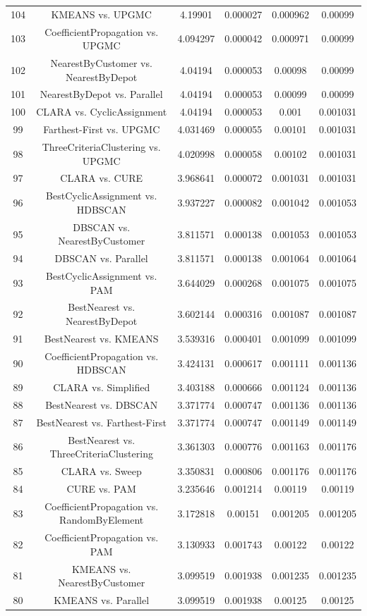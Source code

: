 \documentclass[a4paper,10pt]{article}
\begin{document}
\begin{landscape}
\begin{table}[!htp]
\begin{tabular}{cccccc}
104&KMEANS vs. UPGMC&4.19901&0.000027&0.000962&0.00099\\
103&CoefficientPropagation vs. UPGMC&4.094297&0.000042&0.000971&0.00099\\
102&NearestByCustomer vs. NearestByDepot&4.04194&0.000053&0.00098&0.00099\\
101&NearestByDepot vs. Parallel&4.04194&0.000053&0.00099&0.00099\\
100&CLARA vs. CyclicAssignment&4.04194&0.000053&0.001&0.001031\\
99&Farthest-First vs. UPGMC&4.031469&0.000055&0.00101&0.001031\\
98&ThreeCriteriaClustering vs. UPGMC&4.020998&0.000058&0.00102&0.001031\\
97&CLARA vs. CURE&3.968641&0.000072&0.001031&0.001031\\
96&BestCyclicAssignment vs. HDBSCAN&3.937227&0.000082&0.001042&0.001053\\
95&DBSCAN vs. NearestByCustomer&3.811571&0.000138&0.001053&0.001053\\
94&DBSCAN vs. Parallel&3.811571&0.000138&0.001064&0.001064\\
93&BestCyclicAssignment vs. PAM&3.644029&0.000268&0.001075&0.001075\\
92&BestNearest vs. NearestByDepot&3.602144&0.000316&0.001087&0.001087\\
91&BestNearest vs. KMEANS&3.539316&0.000401&0.001099&0.001099\\
90&CoefficientPropagation vs. HDBSCAN&3.424131&0.000617&0.001111&0.001136\\
89&CLARA vs. Simplified&3.403188&0.000666&0.001124&0.001136\\
88&BestNearest vs. DBSCAN&3.371774&0.000747&0.001136&0.001136\\
87&BestNearest vs. Farthest-First&3.371774&0.000747&0.001149&0.001149\\
86&BestNearest vs. ThreeCriteriaClustering&3.361303&0.000776&0.001163&0.001176\\
85&CLARA vs. Sweep&3.350831&0.000806&0.001176&0.001176\\
84&CURE vs. PAM&3.235646&0.001214&0.00119&0.00119\\
83&CoefficientPropagation vs. RandomByElement&3.172818&0.00151&0.001205&0.001205\\
82&CoefficientPropagation vs. PAM&3.130933&0.001743&0.00122&0.00122\\
81&KMEANS vs. NearestByCustomer&3.099519&0.001938&0.001235&0.001235\\
80&KMEANS vs. Parallel&3.099519&0.001938&0.00125&0.00125\\

\end{tabular}
\end{table}
\end{landscape}
\end{document}

